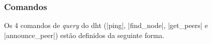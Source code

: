 
\subsubsection*{Comandos}

Os 4 comandos de \emph{query} do \gls*{dht} (\bverb|ping|, \bverb|find_node|,
\bverb|get_peers| e \bverb|announce_peer|) estão definidos da seguinte forma.







